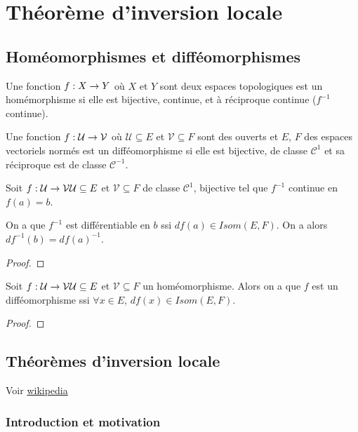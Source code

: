 \chapter{Théorème d'inversion locale}

\section{Homéomorphismes et difféomorphismes}

\begin{definition}
\label{definition_homeomorphisme}
	Une fonction $f : X \rightarrow Y$ où $X$ et $Y$ sont deux espaces
	topologiques est un homémorphisme si elle est bijective, continue, et à
	réciproque continue ($f^{-1}$ continue).
\end{definition}

\begin{definition}
\label{definition_diffeomorphism}
Une fonction $f : \mathcal{U} \rightarrow \mathcal{V}$ où $\mathcal{U}
\subseteq E$ et $\mathcal{V} \subseteq F$ sont des ouverts et $E$, $F$ des espaces
	vectoriels normés est un difféomorphisme si elle est bijective,
	de classe $\mathcal{C}^{1}$ et sa réciproque est de classe
	$\mathcal{C}^{-1}$.
\end{definition}

\begin{proposition}
	Soit $f : \mathcal{U} \rightarrow \mathcal{V} \mathcal{U} \subseteq
	E$ et $\mathcal{V} \subseteq F$ de classe $\mathcal{C}^{1}$, bijective tel
	que $f^{-1}$ continue en $f(a) = b$.

	On a que $f^{-1}$ est différentiable en $b$ ssi $df(a) \in Isom(E, F)$. On a
	alors $df^{-1}(b) = {df(a)}^{-1}$.
\end{proposition}

\begin{proof}
	
\end{proof}

\begin{proposition}
	Soit $f : \mathcal{U} \rightarrow \mathcal{V} \mathcal{U} \subseteq
	E$ et $\mathcal{V} \subseteq F$ un homéomorphisme. Alors on a que $f$ est un
	difféomorphisme ssi $\forall x \in E$, $df(x) \in Isom(E, F)$.
\end{proposition}

\begin{proof}
	
\end{proof}

\section{Théorèmes d'inversion locale}
	Voir
	\href{http://fr.wikipedia.org/wiki/Th%C3%A9or%C3%A8me_d%27inversion_locale}{wikipedia}
\subsection{Introduction et motivation}
